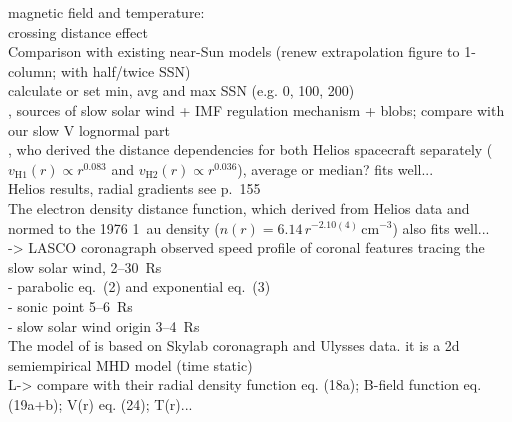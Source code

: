 magnetic field and temperature:\\
crossing distance effect\\

Comparison with existing near-Sun models (renew extrapolation figure to 1-column; with half/twice SSN)\\
calculate or set min, avg and max SSN (e.g. 0, 100, 200)\\

\citet{Wang2000}, sources of slow solar wind + IMF regulation mechanism + blobs; compare with our slow V lognormal part\\

\citet{Schwenn1983,Schwenn1990}, who derived the distance dependencies for both Helios spacecraft separately ($v_\text{H1}(r) \propto r^{0.083}$ and $v_\text{H2}(r) \propto r^{0.036}$), average or median? fits well...\\
Helios results, radial gradients see \citet{Schwenn1990} p.~155\\

The electron density distance function, which \citet{Bougeret1984} derived from Helios data and normed to the 1976 1~au density ($n(r) = 6.14\,r^{-2.10(4)}\,\text{cm}^{-3}$) also fits well...\\

\citet{Sheeley1997} -> LASCO coronagraph observed speed profile of coronal features tracing the slow solar wind, 2--30~Rs\\
- parabolic eq.~(2) and exponential eq.~(3)\\
- sonic point 5--6~Rs\\
- slow solar wind origin 3--4~Rs\\

The model of \citet{Sittler1999} is based on Skylab coronagraph and Ulysses data. it is a 2d semiempirical MHD model (time static)\\
L-> compare with their radial density function eq. (18a); B-field function eq. (19a+b); V(r) eq. (24); T(r)...\\

